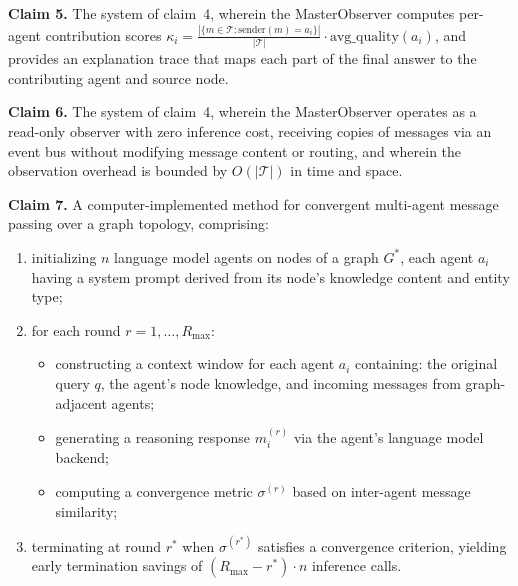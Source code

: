 \documentclass[a4paper,12pt]{article}
\begin{document}
\bigskip

\noindent\textbf{Claim 5.} The system of claim~4, wherein the MasterObserver computes per-agent contribution scores $\kappa_i = \frac{|\{m \in \mathcal{T} : \mathrm{sender}(m) = a_i\}|}{|\mathcal{T}|} \cdot \mathrm{avg\_quality}(a_i)$, and provides an explanation trace that maps each part of the final answer to the contributing agent and source node.

\bigskip

\noindent\textbf{Claim 6.} The system of claim~4, wherein the MasterObserver operates as a read-only observer with zero inference cost, receiving copies of messages via an event bus without modifying message content or routing, and wherein the observation overhead is bounded by $O(|\mathcal{T}|)$ in time and space.

\bigskip


\noindent\textbf{Claim 7.} A computer-implemented method for convergent multi-agent message passing over a graph topology, comprising:

\begin{enumerate}[label=(\alph*),nosep,leftmargin=2em]
\item initializing $n$ language model agents on nodes of a graph $G^*$, each agent $a_i$ having a system prompt derived from its node's knowledge content and entity type;
\item for each round $r = 1, \ldots, R_{\max}$:
  \begin{itemize}[nosep,leftmargin=1.5em]
  \item constructing a context window for each agent $a_i$ containing: the original query $q$, the agent's node knowledge, and incoming messages from graph-adjacent agents;
  \item generating a reasoning response $m_i^{(r)}$ via the agent's language model backend;
  \item computing a convergence metric $\sigma^{(r)}$ based on inter-agent message similarity;
  \end{itemize}
\item terminating at round $r^*$ when $\sigma^{(r^*)}$ satisfies a convergence criterion, yielding early termination savings of $(R_{\max} - r^*) \cdot n$ inference calls.
\end{enumerate}
\end{document}
